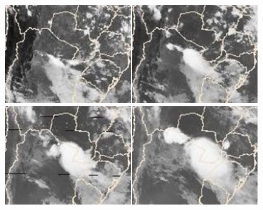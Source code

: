 \begin{figure}
\includegraphics[height=4.3cm]{./figs/sat01.png}\hspace{0.2cm}\includegraphics[height=4.3cm]{./figs/sat02.png}\hspace{0.2cm}\includegraphics[height=4.3cm]{./figs/sat03.png}\hspace{0.2cm}\includegraphics[height=4.3cm]{./figs/sat04.png}
\\[0.15cm]

\end{figure}
